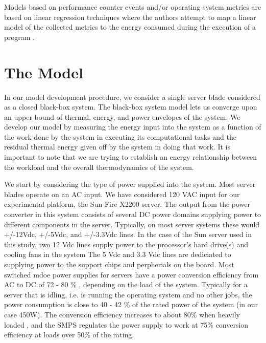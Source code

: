 \documentclass[times, 10pt,onecolumn]{article}
\begin{document}
Models based on performance counter events and/or operating system
metrics are based on linear regression techniques where the authors
attempt to map a linear model of the collected metrics to the energy
consumed during the execution of a program 
 \cite{Isci2003c} \cite{Contreras2005}\cite{Bircher2007}.  

\section{The Model}
\label{sec:model}
In our model development procedure, we consider a single server blade
considered as a closed black-box system.  The
black-box system model lets us converge upon an upper bound of thermal, energy, and
power envelopes of the system.  We develop our model by measuring the 
energy input into the system as a function of the work done by the system in 
executing its computational tasks and the residual thermal energy given off by the system 
in doing that work. It is important to note that we
are trying to establish an energy relationship between the workload and
the overall thermodynamics of the system. 


We start by considering the type of power supplied into the system.
Most server blades operate on an AC input. We have considered 120 VAC
input for our experimental platform, the Sun Fire X2200 server.  The
output from the power converter in this system consists of several DC
power domains supplying power to different components in the server.
Typically, on most server systems these would +/-12Vdc, +/-5Vdc, and
+/-3.3Vdc lines.  In the case of the Sun server used in this study, two
12 Vdc lines supply power to the processor's hard drive(s) and cooling
fans in the system The 5 Vdc and 3.3 Vdc lines are dediciated to
supplying power to the support chips and perpherials on the board.  Most
switched mdoe power supplies for servers have a power conversion
efficiency from AC to DC of 72 - 80 \% , depending on the load of the
system. Typically for a server that is idling, i.e. is running the
operating system and no other jobs, the power consumption is close to 40
- 42 \% of the rated power of the system (in our case 450W). The
conversion efficiency increases to about 80\% when heavily loaded , and
the SMPS regulates the power supply to work at 75\% conversion
efficiency at loads over 50\% of the rating.
\end{document}
